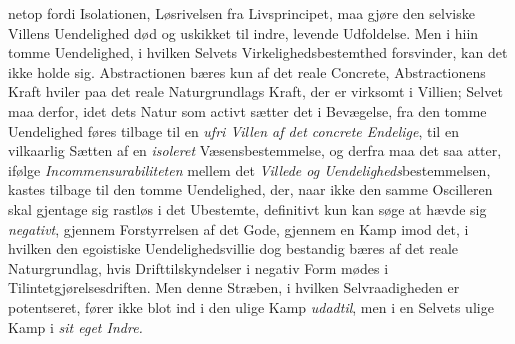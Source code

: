 netop fordi Isolationen, Løsrivelsen fra Livsprincipet, maa gjøre den selviske
Villens Uendelighed død og uskikket til indre, levende Udfoldelse. Men i hiin
tomme Uendelighed, i hvilken Selvets Virkelighedsbestemthed forsvinder, kan det
ikke holde sig. Abstractionen bæres kun af det reale Concrete, Abstractionens
Kraft hviler paa det reale Naturgrundlags Kraft, der er virksomt i Villien;
Selvet maa derfor, idet dets Natur som activt sætter det i Bevægelse, fra den
tomme Uendelighed føres tilbage til en \emph{ufri Villen af det concrete
Endelige}, til en vilkaarlig Sætten af en \emph{isoleret} Væsensbestemmelse, og
derfra maa det saa atter, ifølge \emph{Incommensurabiliteten} mellem det
\emph{Villede og Uendeligheds}bestemmelsen, kastes tilbage til den tomme
Uendelighed, der, naar ikke den samme Oscilleren skal gjentage sig rastløs i det
Ubestemte, definitivt kun kan søge at hævde sig \emph{negativt}, gjennem
Forstyrrelsen af det Gode, gjennem en Kamp imod det, i hvilken den egoistiske
Uendelighedsvillie dog bestandig bæres af det reale Naturgrundlag, hvis
Drifttilskyndelser i negativ Form mødes i Tilintetgjørelsesdriften. Men denne
Stræben, i hvilken Selvraadigheden er potentseret, fører ikke blot ind i den
ulige Kamp \emph{udadtil}, men i en Selvets ulige Kamp i \emph{sit eget Indre.}

